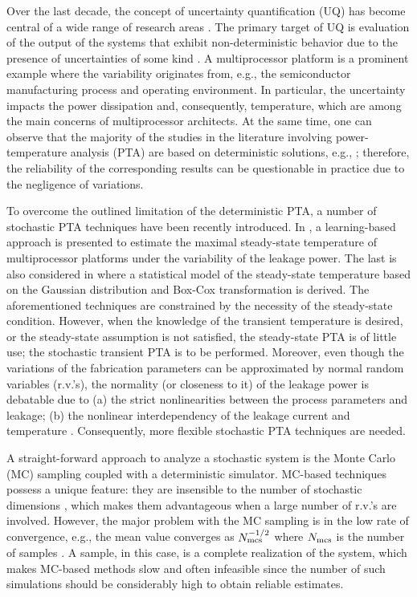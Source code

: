 Over the last decade, the concept of uncertainty quantification (UQ) has become central of a wide range of research areas \cite{xiu2009}. The primary target of UQ is evaluation of the output of the systems that exhibit non-deterministic behavior due to the presence of uncertainties of some kind \cite{eldred2009}. A multiprocessor platform is a prominent example where the variability originates from, e.g., the semiconductor manufacturing process and operating environment. In particular, the uncertainty impacts the power dissipation and, consequently, temperature, which are among the main concerns of multiprocessor architects. At the same time, one can observe that the majority of the studies in the literature involving power-temperature analysis (PTA) are based on deterministic solutions, e.g., \cite{ukhov2012}; therefore, the reliability of the corresponding results can be questionable in practice due to the negligence of variations.

To overcome the outlined limitation of the deterministic PTA, a number of stochastic PTA techniques have been recently introduced. In \cite{juan2011}, a learning-based approach is presented to estimate the maximal steady-state temperature of multiprocessor platforms under the variability of the leakage power. The last is also considered in \cite{juan2012} where a statistical model of the steady-state temperature based on the Gaussian distribution and Box-Cox transformation is derived. The aforementioned techniques are constrained by the necessity of the steady-state condition. However, when the knowledge of the transient temperature is desired, or the steady-state assumption is not satisfied, the steady-state PTA is of little use; the stochastic transient PTA is to be performed. Moreover, even though the variations of the fabrication parameters can be approximated by normal random variables (r.v.'s), the normality (or closeness to it) of the leakage power is debatable due to (a) the strict nonlinearities between the process parameters and leakage; (b) the nonlinear interdependency of the leakage current and temperature \cite{liu2007}. Consequently, more flexible stochastic PTA techniques are needed.

A straight-forward approach to analyze a stochastic system is the Monte Carlo (MC) sampling coupled with a deterministic simulator. MC-based techniques possess a unique feature: they are insensible to the number of stochastic dimensions \cite{maitre2010}, which makes them advantageous when a large number of r.v.'s are involved. However, the major problem with the MC sampling is in the low rate of convergence, e.g., the mean value converges as $N_\text{mcs}^{-{{1}/{2}}}$ where $N_\text{mcs}$ is the number of samples \cite{xiu2009, maitre2010}. A sample, in this case, is a complete realization of the system, which makes MC-based methods slow and often infeasible since the number of such simulations should be considerably high to obtain reliable estimates.


